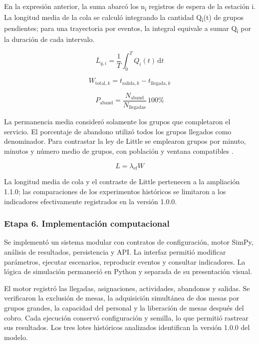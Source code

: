 \documentclass[10pt,a4paper,twocolumn]{article}
\begin{document}
En la expresión anterior, la suma abarcó los n\textsubscript{i} registros de espera de la estación i. La longitud media de la cola se calculó integrando la cantidad Q\textsubscript{i}(t) de grupos pendientes; para una trayectoria por eventos, la integral equivale a sumar Q\textsubscript{i} por la duración de cada intervalo.

\begin{equation}
\overline L_{q,i}=\frac{1}{T}\int_0^T Q_i(t)\,\mathrm dt
\end{equation}

\begin{equation}
W_{\mathrm{total},k}=t_{\mathrm{salida},k}-t_{\mathrm{llegada},k}
\end{equation}

\begin{equation}
P_{\mathrm{aband}}=\frac{N_{\mathrm{aband}}}{N_{\mathrm{llegadas}}}\,100\%
\end{equation}

La permanencia media consideró solamente los grupos que completaron el servicio. El porcentaje de abandono utilizó todos los grupos llegados como denominador. Para contrastar la ley de Little se emplearon grupos por minuto, minutos y número medio de grupos, con población y ventana compatibles \cite{ref1}.

\begin{equation}
L=\lambda_{\mathrm{ef}}W
\end{equation}

La longitud media de cola y el contraste de Little pertenecen a la ampliación 1.1.0; las comparaciones de los experimentos históricos se limitaron a los indicadores efectivamente registrados en la versión 1.0.0.

\subsubsection*{Etapa 6. Implementación computacional}

Se implementó un sistema modular con contratos de configuración, motor SimPy, análisis de resultados, persistencia y API. La interfaz permitió modificar parámetros, ejecutar escenarios, reproducir eventos y consultar indicadores. La lógica de simulación permaneció en Python y separada de su presentación visual.

El motor registró las llegadas, asignaciones, actividades, abandonos y salidas. Se verificaron la exclusión de mesas, la adquisición simultánea de dos mesas por grupos grandes, la capacidad del personal y la liberación de mesas después del cobro. Cada ejecución conservó configuración y semilla, lo que permitió rastrear sus resultados. Los tres lotes históricos analizados identifican la versión 1.0.0 del modelo.
\end{document}
